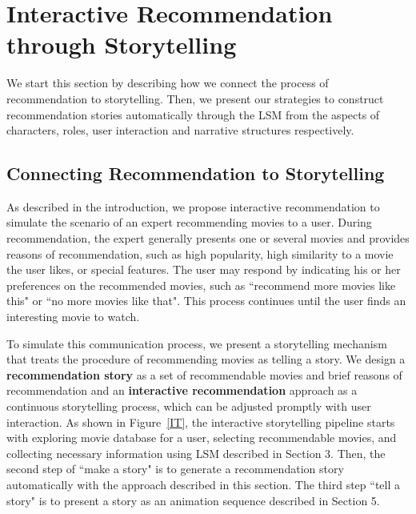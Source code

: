 \documentclass{vgtc}                          %
\begin{document}


%
\section{Interactive Recommendation through Storytelling}

We start this section by describing how we connect the process of recommendation to storytelling.
Then, we present our strategies to construct recommendation stories automatically through the LSM from the aspects of characters, roles, user interaction and narrative structures respectively.


\subsection{Connecting Recommendation to Storytelling}

As described in the introduction, we propose interactive recommendation to simulate the scenario of an expert recommending movies to a user.
During recommendation, the expert generally presents one or several movies and provides reasons of recommendation, such as high popularity, high similarity to a movie the user likes, or special features.
The user may respond by indicating his or her preferences on the recommended movies, such as ``recommend more movies like this" or ``no more movies like that".
This process continues until the user finds an interesting movie to watch.

To simulate this communication process, we present a storytelling mechanism that treats the procedure of recommending movies as telling a story.
We design a \textbf{recommendation story} as a set of recommendable movies and brief reasons of recommendation and an \textbf{interactive recommendation} approach as a continuous storytelling process, which can be adjusted promptly with user interaction.
As shown in Figure~\ref{IT}, the interactive storytelling pipeline starts with exploring movie database for a user, selecting recommendable movies, and collecting necessary information using LSM described in Section 3.
Then, the second step of ``make a story" is to generate a recommendation story automatically with the approach described in this section.
The third step ``tell a story" is to present a story as an animation sequence described in Section 5.
\end{document}
